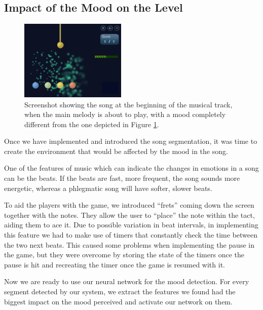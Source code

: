 \subsection{Impact of the Mood on the Level}

\begin{figure}
  \vspace{-10pt}
  \begin{center}
    \includegraphics[width=0.45\textwidth]{Figures/sparkChange}
  \end{center}
  \caption{Screenshot showing the song at the beginning of the musical track, when the main melody is about to play, with a mood completely different from the one depicted in Figure \ref{fig:notetypes}.}
\label{fig:notetypes}
\end{figure}



Once we have implemented and introduced the song segmentation, it was time to create the environment that would be affected by the mood in the song.

One of the features of music which can indicate the changes in emotions in a song can be the beats. If the beats are fast, more frequent, the song sounds more energetic, whereas a phlegmatic song will have softer, slower beats. 

To aid the players with the game, we introduced ``frets'' coming down the screen together with the notes. They allow the user to ``place'' the note within the tact, aiding them to ace it. Due to possible variation in beat intervals, in implementing this feature we had to make use of timers that constantly check the time between the two next beats. This caused some problems when implementing the pause in the game, but they were overcome by storing the state of the timers once the pause is hit and recreating the timer once the game is resumed with it. 

Now we are ready to use our neural network for the mood detection. For every segment detected by our system, we extract the features we found had the biggest impact on the mood perceived and activate our network on them. 

